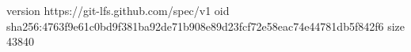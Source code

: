 version https://git-lfs.github.com/spec/v1
oid sha256:4763f9e61c0bd9f381ba92de71b908e89d23fcf72e58eac74e44781db5f842f6
size 43840
